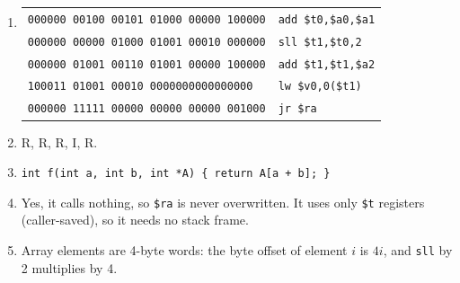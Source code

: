 \documentclass[11pt]{article}
\begin{document}
\begin{solution}[\ref{x:decode}]
\leavevmode
\begin{enumerate}[label=(\alph*),leftmargin=*]
  \item
  \begin{tabular}[t]{@{}ll@{}}
  \texttt{000000 00100 00101 01000 00000 100000} & \texttt{add \$t0,\$a0,\$a1} \\
  \texttt{000000 00000 01000 01001 00010 000000} & \texttt{sll \$t1,\$t0,2} \\
  \texttt{000000 01001 00110 01001 00000 100000} & \texttt{add \$t1,\$t1,\$a2} \\
  \texttt{100011 01001 00010 0000000000000000} & \texttt{lw \$v0,0(\$t1)} \\
  \texttt{000000 11111 00000 00000 00000 001000} & \texttt{jr \$ra} \\
  \end{tabular}
  \item R, R, R, I, R.
  \item \texttt{int f(int a, int b, int *A) \{ return A[a + b]; \}}
  \item Yes, it calls nothing, so \texttt{\$ra} is never overwritten. It uses
  only \texttt{\$t} registers (caller-saved), so it needs no stack frame.
  \item Array elements are 4-byte words: the byte offset of element $i$ is
  $4i$, and \texttt{sll} by 2 multiplies by 4.
\end{enumerate}
\end{solution}
\end{document}
